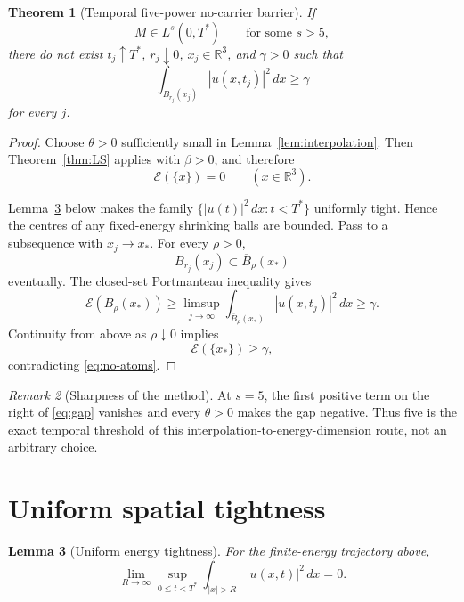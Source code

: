 \documentclass[11pt]{article}
\newtheorem{theorem}{Theorem}
\newtheorem{lemma}[theorem]{Lemma}
\theoremstyle{remark}
\newtheorem{remark}[theorem]{Remark}
\newcommand{\R}{\mathbb R}
\begin{document}
\begin{theorem}[Temporal five-power no-carrier barrier]
\label{thm:five}
If
\[
 M\in L^s(0,T^*)
 \qquad\text{for some }s>5,
\]
there do not exist \(t_j\uparrow T^*\), \(r_j\downarrow0\), \(x_j\in\R^3\),
and \(\gamma>0\) such that
\[
 \int_{B_{r_j}(x_j)}|u(x,t_j)|^2\,dx\ge\gamma
\]
for every \(j\).
\end{theorem}

\begin{proof}
Choose \(\theta>0\) sufficiently small in Lemma~\ref{lem:interpolation}.
Then Theorem~\ref{thm:LS} applies with \(\beta>0\), and therefore
\begin{equation}
 \label{eq:no-atoms}
 \mathcal E(\{x\})=0
 \qquad(x\in\R^3).
\end{equation}

Lemma~\ref{lem:tightness} below makes the family
\(\{|u(t)|^2\,dx:t<T^*\}\) uniformly tight.  Hence the centres of any
fixed-energy shrinking balls are bounded.  Pass to a subsequence with
\(x_j\to x_*\).  For every \(\rho>0\),
\[
 B_{r_j}(x_j)\subset\overline B_\rho(x_*)
\]
eventually.  The closed-set Portmanteau inequality gives
\[
 \mathcal E(\overline B_\rho(x_*))
 \ge
 \limsup_{j\to\infty}
 \int_{\overline B_\rho(x_*)}|u(x,t_j)|^2\,dx
 \ge\gamma.
\]
Continuity from above as \(\rho\downarrow0\) implies
\[
 \mathcal E(\{x_*\})\ge\gamma,
\]
contradicting \eqref{eq:no-atoms}.
\end{proof}

\begin{remark}[Sharpness of the method]
At \(s=5\), the first positive term on the right of \eqref{eq:gap}
vanishes and every \(\theta>0\) makes the gap negative.  Thus five is the
exact temporal threshold of this interpolation-to-energy-dimension route,
not an arbitrary choice.
\end{remark}

\section{Uniform spatial tightness}

\begin{lemma}[Uniform energy tightness]
\label{lem:tightness}
For the finite-energy trajectory above,
\[
 \lim_{R\to\infty}
 \sup_{0\le t<T^*}
 \int_{|x|>R}|u(x,t)|^2\,dx
 =0.
\]
\end{lemma}
\end{document}
